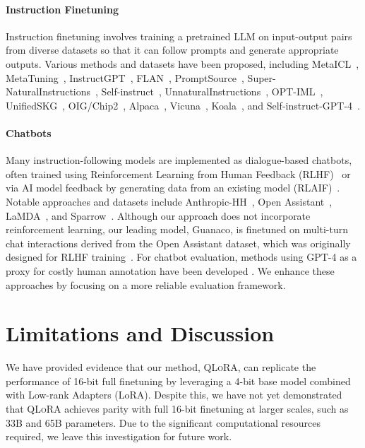 \paragraph{Instruction Finetuning} Instruction finetuning involves training a pretrained LLM on input-output pairs from diverse datasets so that it can follow prompts and generate appropriate outputs. Various methods and datasets have been proposed, including MetaICL~\citep{min2021metaicl}, MetaTuning~\citep{zhong2021adapting}, InstructGPT~\citep{ouyang2022training}, FLAN~\citep{wei2021finetuned,chung2022scaling}, PromptSource~\citep{bach2022promptsource}, Super-NaturalInstructions~\citep{wang2022super,sanh2021multitask}, Self-instruct~\citep{wang2022self}, UnnaturalInstructions~\citep{honovich2022unnatural}, OPT-IML~\citep{iyer2022opt}, UnifiedSKG~\citep{xie2022unifiedskg}, OIG/Chip2~\citep{laion2023}, Alpaca~\citep{alpaca}, Vicuna~\citep{vicuna2023}, Koala~\citep{koala_blogpost_2023}, and Self-instruct-GPT-4~\citep{peng2023instruction}.

\paragraph{Chatbots} Many instruction-following models are implemented as dialogue-based chatbots, often trained using Reinforcement Learning from Human Feedback (RLHF)~\citep{christiano2017deep} or via AI model feedback by generating data from an existing model (RLAIF)~\citep{bai2022constitutional}. Notable approaches and datasets include Anthropic-HH~\citep{askell2021general,bai2022training}, Open Assistant~\citep{kopf2023openassistant}, LaMDA~\citep{thoppilan2022lamda}, and Sparrow~\citep{glaese2022improving}. Although our approach does not incorporate reinforcement learning, our leading model, Guanaco, is finetuned on multi-turn chat interactions derived from the Open Assistant dataset, which was originally designed for RLHF training~\citep{kopf2023openassistant}. For chatbot evaluation, methods using GPT-4 as a proxy for costly human annotation have been developed \citep{vicuna2023,peng2023instruction}. We enhance these approaches by focusing on a more reliable evaluation framework.

\section{Limitations and Discussion}

We have provided evidence that our method, \textsc{QLoRA}, can replicate the performance of 16-bit full finetuning by leveraging a 4-bit base model combined with Low-rank Adapters (LoRA). Despite this, we have not yet demonstrated that \textsc{QLoRA} achieves parity with full 16-bit finetuning at larger scales, such as 33B and 65B parameters. Due to the significant computational resources required, we leave this investigation for future work.

